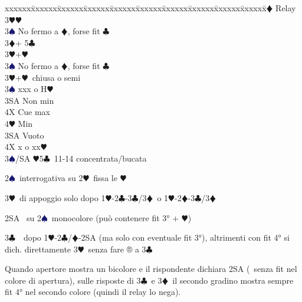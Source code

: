 \documentclass[a4paper,italian]{article}
\newcommand{\BC}{\textcolor{OliveGreen}{$\clubsuit$}}
\newcommand{\BD}{\textcolor{RedOrange}{$\vardiamondsuit$}}
\newcommand{\BH}{\textcolor{Red2}{$\varheartsuit${}}}
\newcommand{\BS}{\textcolor{MidnightBlue}{$\spadesuit${}}}
\newenvironment{bidtable}
{\begin{tabbing}

    xxxxxx\=xxxxxx\=xxxxxx\=xxxxxx\=xxxxxx\=xxxxxx\=xxxxxx\=xxxxxx\=xxxxxx\=xxxxxx\=\kill}
{\end{tabbing} }%
\newenvironment{varie}[1]
{\begin{tcolorbox}[colframe=green!40!black,title=#1]}
    {
\end{tcolorbox} }%
\begin{document}
\begin{multicols}{2}
\begin{bidtable}
                                            3\BD \> Relay\\
                                            3\BH {}\BH \\
                                            3\BS \> No fermo a \BD , forse fit \BC \-\\
                                            3\BD {}+ 5\BC \+\\
                                            3\BH {}+\BH \\
                                            3\BS \> No fermo a \BD , forse fit \BC \-\\
                                            3\BH {}+\BH\ chiusa o semi\+\\
                                            3\BS \> xxx o H\BH \+\\
                                            3SA \> Non min\\
                                            4X \> Cue max\\
                                            4\BH \> Min\-\\
                                            3SA \> Vuoto\\
                                            4X \> x o xx\BH \-\\
                                            3\BS/SA \BH 5\BC\ 11-14 concentrata/bucata
                                        \end{bidtable}
                                    \end{multicols}
                                    \begin{varie}{Riepilogo mnemonico per i fissaggi}
                                        2\BS\ interrogativa su 2\BH\ fissa le \BH

                                        3\BH\ di appoggio solo dopo 1\BH-2\BC-3\BC/3\BD\ o 1\BH-2\BD-3\BC/3\BD

                                        2SA \textregistered\ su 2\BS\ monocolore  (può contenere fit 3° + \BH )

                                        3\BC\ \textregistered\ dopo 1\BH-2\BC/\BD-2SA (ma solo con eventuale fit 3°), altrimenti con fit 4° si dich.
                                        direttamente 3\BH\ senza fare ® a 3\BC

                                        Quando apertore mostra un bicolore e il rispondente dichiara 2SA (\textregistered\ senza fit nel colore di apertura), sulle risposte di 3\BC\ e 3\BD\ il secondo gradino mostra sempre fit 4° nel secondo colore (quindi il relay lo nega).

                                    \end{varie}
                                    \newpage
\end{document}
